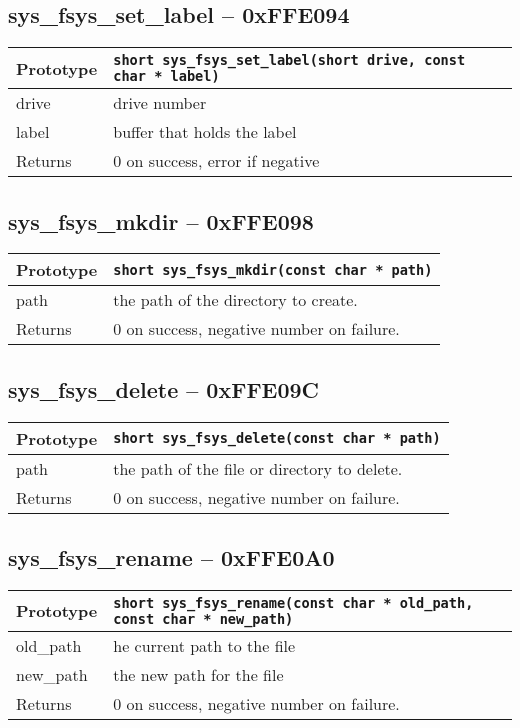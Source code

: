\subsection*{sys\_fsys\_set\_label -- 0xFFE094}
\begin{tabular}{|l||l|} \hline
Prototype & \lstinline!short sys_fsys_set_label(short drive, const char * label)! \\ \hline
drive & drive number \\ \hline
label & buffer that holds the label \\ \hline
Returns & 0 on success, error if negative \\ \hline
\end{tabular}

\subsection*{sys\_fsys\_mkdir -- 0xFFE098}
\begin{tabular}{|l||l|} \hline
Prototype & \lstinline!short sys_fsys_mkdir(const char * path)! \\ \hline
path & the path of the directory to create. \\ \hline
Returns & 0 on success, negative number on failure. \\ \hline
\end{tabular}

\subsection*{sys\_fsys\_delete -- 0xFFE09C}
\begin{tabular}{|l||l|} \hline
Prototype & \lstinline!short sys_fsys_delete(const char * path)! \\ \hline
path & the path of the file or directory to delete. \\ \hline
Returns & 0 on success, negative number on failure. \\ \hline
\end{tabular}

\subsection*{sys\_fsys\_rename -- 0xFFE0A0}
\begin{tabular}{|l||l|} \hline
Prototype & \lstinline!short sys_fsys_rename(const char * old_path, const char * new_path)! \\ \hline
old\_path & he current path to the file \\ \hline
new\_path & the new path for the file \\ \hline
Returns & 0 on success, negative number on failure. \\ \hline
\end{tabular}

